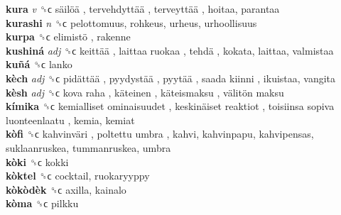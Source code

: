 \textbf{kura} \emph{v}  ␝ϲ   säilöä ,  tervehdyttää ,  terveyttää , hoitaa, parantaa  \\
\textbf{kurashi} \emph{n}  ␝ϲ  pelottomuus, rohkeus, urheus, urhoollisuus  \\
\textbf{kurpa} ␝ϲ   elimistö , rakenne  \\
\textbf{kushiná} \emph{adj}  ␝ϲ   keittää ,  laittaa ruokaa ,  tehdä , kokata, laittaa, valmistaa  \\
\textbf{kuñá} ␝ϲ  lanko  \\
\textbf{kèch} \emph{adj}  ␝ϲ   pidättää ,  pyydystää ,  pyytää ,  saada kiinni , ikuistaa, vangita  \\
\textbf{kèsh} \emph{adj}  ␝ϲ   kova raha ,  käteinen ,  käteismaksu ,  välitön maksu   \\
\textbf{kímika} ␝ϲ   kemialliset ominaisuudet ,  keskinäiset reaktiot ,  toisiinsa sopiva luonteenlaatu , kemia, kemiat  \\
\textbf{kòfi} ␝ϲ   kahvinväri ,  poltettu umbra , kahvi, kahvinpapu, kahvipensas, suklaanruskea, tummanruskea, umbra  \\
\textbf{kòki} ␝ϲ  kokki  \\
\textbf{kòktel} ␝ϲ  cocktail, ruokaryyppy  \\
\textbf{kòkòdèk} ␝ϲ  axilla, kainalo  \\
\textbf{kòma} ␝ϲ  pilkku  \\

